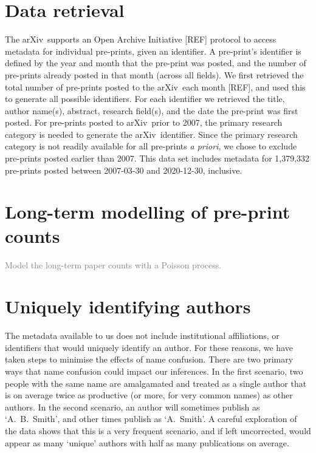 \documentclass{nature}
\newcommand{\todo}[1]{\textcolor{gray}{#1}}
\newcommand{\arxiv}{arXiv}
\begin{document}
\begin{methods}

\section*{Data retrieval}

The \arxiv\ supports an Open Archive Initiative [REF] protocol to access metadata for individual pre-prints, given an identifier. A pre-print's identifier is defined by the year and month that the pre-print was posted, and the number of pre-prints already posted in that month (across all fields). We first retrieved the total number of pre-prints posted to the \arxiv\ each month [REF], and used this to generate all possible identifiers. For each identifier we retrieved the title, author name(s), abstract, research field(s), and the date the pre-print was first posted. For pre-prints posted to \arxiv\ prior to 2007, the primary research category is needed to generate the \arxiv\ identifier. Since the primary research category is not readily available for all pre-prints \emph{a priori}, we chose to exclude pre-prints posted earlier than 2007. This data set includes metadata for 1,379,332 pre-prints posted between 2007-03-30 and 2020-12-30, inclusive.


\section*{Long-term modelling of pre-print counts}

\todo{Model the long-term paper counts with a Poisson process.}


\section*{Uniquely identifying authors}

The metadata available to us does not include institutional affiliations, or identifiers that would uniquely identify an author. For these reasons, we have taken steps to minimise the effects of name confusion. There are two primary ways that name confusion could impact our inferences. In the first scenario, two people with the same name are amalgamated and treated as a single author that is on average twice as productive (or more, for very common names) as other authors. In the second scenario, an author will sometimes publish as `A.~B.~Smith', and other times publish as `A.~Smith'. A careful exploration of the data shows that this is a very frequent scenario, and if left uncorrected, would appear as many `unique' authors with half as many publications on average.


\end{methods}
\end{document}
